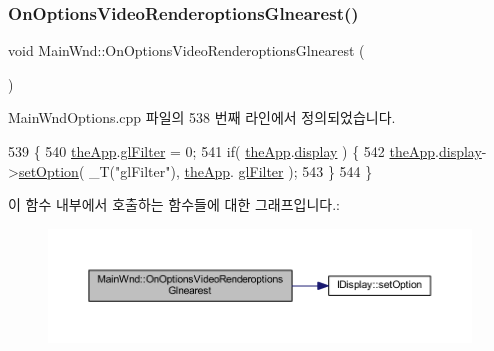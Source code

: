 \subsubsection{\texorpdfstring{On\+Options\+Video\+Renderoptions\+Glnearest()}{OnOptionsVideoRenderoptionsGlnearest()}}
{\footnotesize\ttfamily void Main\+Wnd\+::\+On\+Options\+Video\+Renderoptions\+Glnearest (\begin{DoxyParamCaption}{ }\end{DoxyParamCaption})\hspace{0.3cm}{\ttfamily [protected]}}



Main\+Wnd\+Options.\+cpp 파일의 538 번째 라인에서 정의되었습니다.


\begin{DoxyCode}
539 \{
540     \mbox{\hyperlink{_v_b_a_8cpp_a8095a9d06b37a7efe3723f3218ad8fb3}{theApp}}.\mbox{\hyperlink{class_v_b_a_a7861cd60864163f310ae87f746eba9e6}{glFilter}} = 0;
541     \textcolor{keywordflow}{if}( \mbox{\hyperlink{_v_b_a_8cpp_a8095a9d06b37a7efe3723f3218ad8fb3}{theApp}}.\mbox{\hyperlink{class_v_b_a_a940e5bad8b3ed2436888dbcd03bfd563}{display}} ) \{
542         \mbox{\hyperlink{_v_b_a_8cpp_a8095a9d06b37a7efe3723f3218ad8fb3}{theApp}}.\mbox{\hyperlink{class_v_b_a_a940e5bad8b3ed2436888dbcd03bfd563}{display}}->\mbox{\hyperlink{class_i_display_a1766244708c252bb8781892c76c20ba9}{setOption}}( \_T(\textcolor{stringliteral}{"glFilter"}), \mbox{\hyperlink{_v_b_a_8cpp_a8095a9d06b37a7efe3723f3218ad8fb3}{theApp}}.
      \mbox{\hyperlink{class_v_b_a_a7861cd60864163f310ae87f746eba9e6}{glFilter}} );
543     \}
544 \}
\end{DoxyCode}
이 함수 내부에서 호출하는 함수들에 대한 그래프입니다.\+:
\nopagebreak
\begin{figure}[H]
\begin{center}
\leavevmode
\includegraphics[width=350pt]{class_main_wnd_a02eb06936ef0d4723a0bf743db3d929b_cgraph}
\end{center}
\end{figure}
\mbox{\label{class_main_wnd_adc9d14bd286462fdf5f04111352de799}} 
